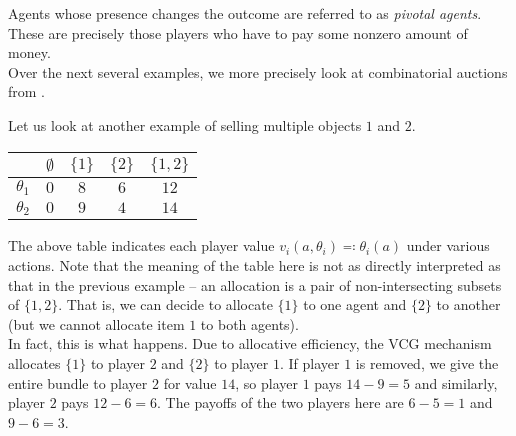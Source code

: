 		Agents whose presence changes the outcome are referred to as \emph{pivotal agents}. These are precisely those players who have to pay some nonzero amount of money.\\
		Over the next several examples, we more precisely look at combinatorial auctions from .

		\begin{fex}
			Let us look at another example of selling multiple objects $1$ and $2$.
			\begin{center}
			\begin{tabular}{|c||c|c|c|c|}
				\hline
				& $\emptyset$ & $\{1\}$ & $\{2\}$ & $\{1,2\}$ \\
				\hline\hline
				$\theta_1$ & $0$ & $8$ & $6$ & $12$ \\
				\hline
				$\theta_2$ & $0$ & $9$ & $4$ & $14$ \\ \hline
			\end{tabular}
			\end{center}
			The above table indicates each player value $v_i(a,\theta_i) \eqqcolon \theta_i(a)$ under various actions. Note that the meaning of the table here is not as directly interpreted as that in the previous example -- an allocation is a pair of non-intersecting subsets of $\{1,2\}$. That is, we can decide to allocate $\{1\}$ to one agent and $\{2\}$ to another (but we cannot allocate item $1$ to both agents). \\
			In fact, this is what happens. Due to allocative efficiency, the VCG mechanism allocates $\{1\}$ to player $2$ and $\{2\}$ to player $1$. If player $1$ is removed, we give the entire bundle to player $2$ for value $14$, so player $1$ pays $14-9 = 5$ and similarly, player $2$ pays $12-6 = 6$. The payoffs of the two players here are $6-5 = 1$ and $9-6 = 3$.
		\end{fex}


